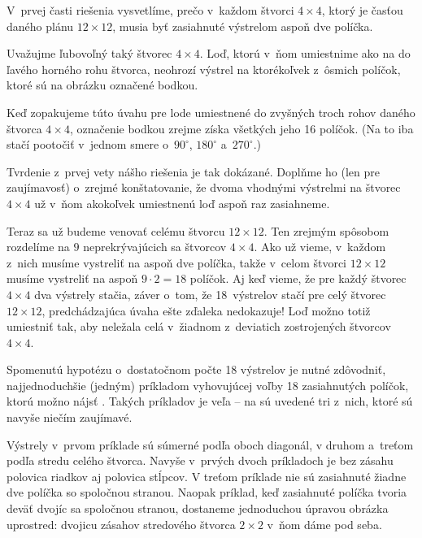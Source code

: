 {%
V~prvej časti riešenia vysvetlíme, prečo v~každom štvorci
$4\times4$, ktorý je časťou daného plánu $12\times12$,
musia byť zasiahnuté výstrelom aspoň dve políčka.

Uvažujme ľubovoľný taký štvorec $4\times4$. Loď, ktorú v~ňom
umiestnime ako na \obr{} do ľavého horného rohu štvorca,
neohrozí výstrel na ktorékoľvek z~ôsmich políčok, ktoré sú na
obrázku označené bodkou.
%


Keď zopakujeme túto úvahu pre lode umiestnené do zvyšných troch rohov
daného štvorca $4\times4$, označenie bodkou zrejme získa všetkých jeho 16 políčok.
(Na to iba stačí  pootočiť v~jednom smere
o~$90^{\circ}$, $180^{\circ}$ a~$270^{\circ}$.)

Tvrdenie z~prvej vety nášho riešenia je tak dokázané. Doplňme ho
(len pre zaujímavosť) o~zrejmé konštatovanie,
že dvoma vhodnými výstrelmi na štvorec $4\times4$ už v~ňom
akokoľvek umiestnenú loď aspoň raz zasiahneme.

Teraz sa už budeme venovať celému štvorcu $12\times12$.
Ten zrejmým spôsobom rozdelíme na $9$ neprekrývajúcich
sa štvorcov $4\times4$. Ako už vieme, v~každom z~nich
musíme vystreliť na aspoň dve políčka,
takže v~celom štvorci $12\times12$ musíme vystreliť na aspoň
$9\cdot2=18$ políčok. Aj keď vieme, že pre každý štvorec $4\times4$
dva výstrely stačia, záver o~tom, že 18~výstrelov stačí pre celý štvorec
$12\times12$, predchádzajúca úvaha ešte zďaleka nedokazuje!
Loď možno totiž umiestniť tak, aby neležala celá v~žiadnom z~deviatich
zostrojených štvorcov $4\times4$.

Spomenutú hypotézu o~dostatočnom počte 18 výstrelov je nutné
zdôvodniť, najjednoduchšie (jedným) príkladom vyhovujúcej
voľby 18 zasiahnutých políčok, ktorú možno nájsť . Takých príkladov je veľa --
na \obr{} sú uvedené tri z~nich, ktoré sú navyše niečím zaujímavé.
%

Výstrely v~prvom príklade sú súmerné podľa oboch diagonál, v druhom
a~treťom podľa stredu celého štvorca.
Navyše v~prvých dvoch príkladoch je bez zásahu polovica riadkov
aj polovica stĺpcov. V treťom príklade nie sú zasiahnuté žiadne dve
políčka so spoločnou stranou. Naopak príklad, keď zasiahnuté
políčka tvoria deväť dvojíc sa spoločnou stranou, dostaneme
jednoduchou úpravou obrázka uprostred:  dvojicu zásahov
stredového štvorca $2\times2$ v~ňom dáme pod seba.

}
